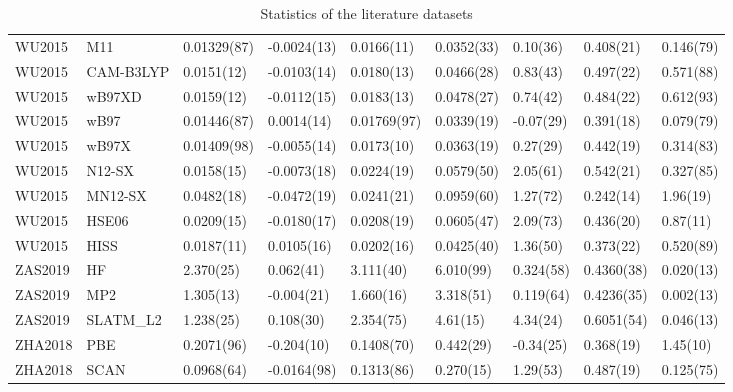 \begin{table}[ht]
\begin{tabular}{lllllllll}
  WU2015 & M11 & 0.01329(87) & -0.0024(13) & 0.0166(11) & 0.0352(33) & 0.10(36) & 0.408(21) & 0.146(79) \\ 
  WU2015 & CAM-B3LYP & 0.0151(12) & -0.0103(14) & 0.0180(13) & 0.0466(28) & 0.83(43) & 0.497(22) & 0.571(88) \\ 
  WU2015 & wB97XD & 0.0159(12) & -0.0112(15) & 0.0183(13) & 0.0478(27) & 0.74(42) & 0.484(22) & 0.612(93) \\ 
  WU2015 & wB97 & 0.01446(87) & 0.0014(14) & 0.01769(97) & 0.0339(19) & -0.07(29) & 0.391(18) & 0.079(79) \\ 
  WU2015 & wB97X & 0.01409(98) & -0.0055(14) & 0.0173(10) & 0.0363(19) & 0.27(29) & 0.442(19) & 0.314(83) \\ 
  WU2015 & N12-SX & 0.0158(15) & -0.0073(18) & 0.0224(19) & 0.0579(50) & 2.05(61) & 0.542(21) & 0.327(85) \\ 
  WU2015 & MN12-SX & 0.0482(18) & -0.0472(19) & 0.0241(21) & 0.0959(60) & 1.27(72) & 0.242(14) & 1.96(19) \\ 
  WU2015 & HSE06 & 0.0209(15) & -0.0180(17) & 0.0208(19) & 0.0605(47) & 2.09(73) & 0.436(20) & 0.87(11) \\ 
  WU2015 & HISS & 0.0187(11) & 0.0105(16) & 0.0202(16) & 0.0425(40) & 1.36(50) & 0.373(22) & 0.520(89) \\ 
  ZAS2019 & HF & 2.370(25) & 0.062(41) & 3.111(40) & 6.010(99) & 0.324(58) & 0.4360(38) & 0.020(13) \\ 
  ZAS2019 & MP2 & 1.305(13) & -0.004(21) & 1.660(16) & 3.318(51) & 0.119(64) & 0.4236(35) & 0.002(13) \\ 
  ZAS2019 & SLATM\_L2 & 1.238(25) & 0.108(30) & 2.354(75) & 4.61(15) & 4.34(24) & 0.6051(54) & 0.046(13) \\ 
  ZHA2018 & PBE & 0.2071(96) & -0.204(10) & 0.1408(70) & 0.442(29) & -0.34(25) & 0.368(19) & 1.45(10) \\ 
  ZHA2018 & SCAN & 0.0968(64) & -0.0164(98) & 0.1313(86) & 0.270(15) & 1.29(53) & 0.487(19) & 0.125(75) \\ 
   \hline
\end{tabular}
\caption{Statistics of the literature datasets} 
\label{tab:statsLit}
\end{table}
